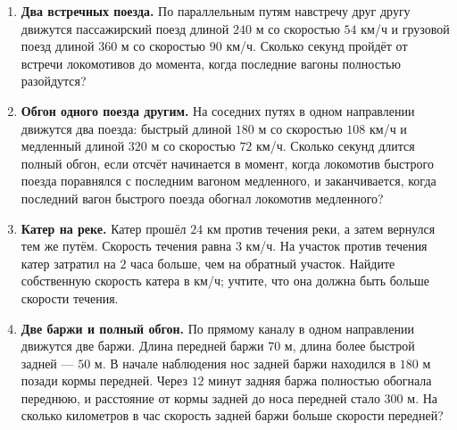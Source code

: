 \documentclass[a4paper,12pt]{article}
\begin{document}
\begin{enumerate}[label=\textcolor{darkaccent}{\textbf{\arabic*.}},leftmargin=9mm,itemsep=11pt]
\item \textbf{Два встречных поезда.} По параллельным путям навстречу друг другу движутся пассажирский поезд длиной $240$ м со скоростью $54$ км/ч и грузовой поезд длиной $360$ м со скоростью $90$ км/ч. Сколько секунд пройдёт от встречи локомотивов до момента, когда последние вагоны полностью разойдутся?

\item \textbf{Обгон одного поезда другим.} На соседних путях в одном направлении движутся два поезда: быстрый длиной $180$ м со скоростью $108$ км/ч и медленный длиной $320$ м со скоростью $72$ км/ч. Сколько секунд длится полный обгон, если отсчёт начинается в момент, когда локомотив быстрого поезда поравнялся с последним вагоном медленного, и заканчивается, когда последний вагон быстрого поезда обогнал локомотив медленного?

\item \textbf{Катер на реке.} Катер прошёл $24$ км против течения реки, а затем вернулся тем же путём. Скорость течения равна $3$ км/ч. На участок против течения катер затратил на $2$ часа больше, чем на обратный участок. Найдите собственную скорость катера в км/ч; учтите, что она должна быть больше скорости течения.

\item \textbf{Две баржи и полный обгон.} По прямому каналу в одном направлении движутся две баржи. Длина передней баржи $70$ м, длина более быстрой задней --- $50$ м. В начале наблюдения нос задней баржи находился в $180$ м позади кормы передней. Через $12$ минут задняя баржа полностью обогнала переднюю, и расстояние от кормы задней до носа передней стало $300$ м. На сколько километров в час скорость задней баржи больше скорости передней?
\end{enumerate}
\end{document}
